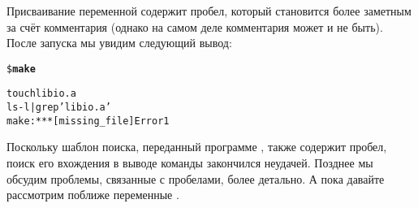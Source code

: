 Присваивание переменной содержит пробел, который становится более
заметным за счёт комментария (однако на самом деле комментария может и
не быть). После запуска \GNUmake{} мы увидим следующий вывод:

{\footnotesize
\begin{alltt}
\$ \textbf{make}

touch libio.a 
ls -l | grep 'libio.a '
make: *** [missing\_file] Error 1
\end{alltt}
}

Поскольку шаблон поиска, переданный программе , также
содержит пробел, поиск его вхождения в выводе команды 
закончился неудачей. Позднее мы обсудим проблемы, связанные с
пробелами, более детально. А пока давайте рассмотрим поближе
переменные \GNUmake{}.









